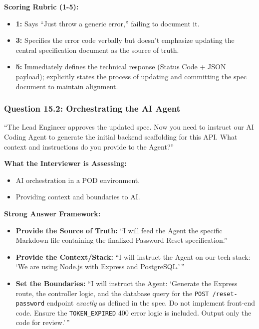 \textbf{Scoring Rubric (1-5):}

\begin{itemize}
\tightlist
\item
  \textbf{1:} Says ``Just throw a generic error,'' failing to document
  it.
\item
  \textbf{3:} Specifies the error code verbally but doesn't emphasize
  updating the central specification document as the source of truth.
\item
  \textbf{5:} Immediately defines the technical response (Status Code +
  JSON payload); explicitly states the process of updating and
  committing the spec document to maintain alignment.
\end{itemize}

\subsubsection{Question 15.2: Orchestrating the AI
Agent}\label{question-15.2-orchestrating-the-ai-agent}

``The Lead Engineer approves the updated spec. Now you need to instruct
our AI Coding Agent to generate the initial backend scaffolding for this
API. What context and instructions do you provide to the Agent?''

\textbf{What the Interviewer is Assessing:}

\begin{itemize}
\tightlist
\item
  AI orchestration in a POD environment.
\item
  Providing context and boundaries to AI.
\end{itemize}

\textbf{Strong Answer Framework:}

\begin{itemize}
\tightlist
\item
  \textbf{Provide the Source of Truth:} ``I will feed the Agent the
  specific Markdown file containing the finalized Password Reset
  specification.''
\item
  \textbf{Provide the Context/Stack:} ``I will instruct the Agent on our
  tech stack: `We are using Node.js with Express and PostgreSQL.'\,''
\item
  \textbf{Set the Boundaries:} ``I will instruct the Agent: `Generate
  the Express route, the controller logic, and the database query for
  the \texttt{POST\ /reset-password} endpoint \emph{exactly} as defined
  in the spec. Do not implement front-end code. Ensure the
  \texttt{TOKEN\_EXPIRED} 400 error logic is included. Output only the
  code for review.'\,''
\end{itemize}

